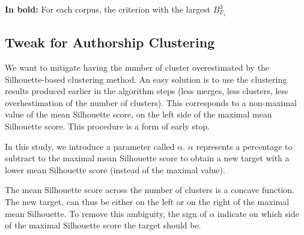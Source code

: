 \begin{table}
  \caption{Silhouette-based clustering evaluation (Maximal Silhouette, $\alpha = 0$), mean $B^3_{F_1}$/$r_{diff}$}
  \label{tab:silhouette-based_clustering}

  \vspace{0.2cm}

  \textbf{In bold:} For each corpus, the criterion with the largest $B^3_{F_1}$
\end{table}

\subsection{Tweak for Authorship Clustering}

We want to mitigate having the number of cluster overestimated by the Silhouette-based clustering method.
An easy solution is to use the clustering results produced earlier in the algorithm steps (less merges, less clusters, less overhestimation of the number of clusters).
This corresponds to a non-maximal value of the mean Silhouette score, on the left side of the maximal mean Silhouette score.
This procedure is a form of early stop.

In this study, we introduce a parameter called $\alpha$.
$\alpha$ represents a percentage to subtract to the maximal mean Silhouette score to obtain a new target with a lower mean Silhouette score (instead of the maximal value).

The mean Silhouette score across the number of clusters is a concave function.
The new target, can thus be either on the left or on the right of the maximal mean Silhouette.
To remove this ambiguity, the sign of $\alpha$ indicate on which side of the maximal Silhouette score the target should be.

